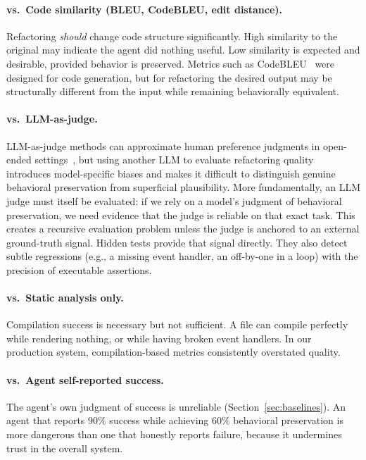 \documentclass[11pt,letterpaper]{article}
\begin{document}
\paragraph{vs.\ Code similarity (BLEU, CodeBLEU, edit distance).} Refactoring \emph{should} change code structure significantly. High similarity to the original may indicate the agent did nothing useful. Low similarity is expected and desirable, provided behavior is preserved. Metrics such as CodeBLEU~\citep{ren2020codebleu} were designed for code generation, but for refactoring the desired output may be structurally different from the input while remaining behaviorally equivalent.

\paragraph{vs.\ LLM-as-judge.} LLM-as-judge methods can approximate human preference judgments in open-ended settings~\citep{zheng2023judging}, but using another LLM to evaluate refactoring quality introduces model-specific biases and makes it difficult to distinguish genuine behavioral preservation from superficial plausibility. More fundamentally, an LLM judge must itself be evaluated: if we rely on a model's judgment of behavioral preservation, we need evidence that the judge is reliable on that exact task. This creates a recursive evaluation problem unless the judge is anchored to an external ground-truth signal. Hidden tests provide that signal directly. They also detect subtle regressions (e.g., a missing event handler, an off-by-one in a loop) with the precision of executable assertions.

\paragraph{vs.\ Static analysis only.} Compilation success is necessary but not sufficient. A file can compile perfectly while rendering nothing, or while having broken event handlers. In our production system, compilation-based metrics consistently overstated quality.

\paragraph{vs.\ Agent self-reported success.} The agent's own judgment of success is unreliable (Section~\ref{sec:baselines}). An agent that reports 90\% success while achieving 60\% behavioral preservation is more dangerous than one that honestly reports failure, because it undermines trust in the overall system.
\end{document}
